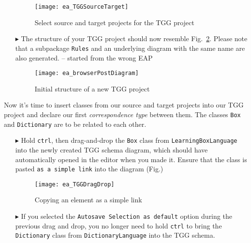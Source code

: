 \begin{itemize}
\begin{figure}[htbp]
\begin{center}
  \texttt{[image: ea\_TGGSourceTarget]}
  \caption{Select source and target projects for the TGG project}  
  \label{fig:select_source_target}
\end{center}
\end{figure}

\item[$\blacktriangleright$] The structure of your TGG project should now resemble Fig.~\ref{fig:new_tgg_project}. Please note that a subpackage \texttt{Rules}
and an underlying diagram with the same name are also generated. \update -- started from the wrong EAP

\begin{figure}[htbp]
\begin{center}
  \texttt{[image: ea\_browserPostDiagram]}
  \caption{Initial structure of a new TGG project}  
  \label{fig:new_tgg_project}
\end{center}
\end{figure}
\end{itemize}
\clearpage

Now it's time to insert classes from our source and target projects into our TGG project and declare our first \emph{correspondence type} between them.
The classes \texttt{Box} and \texttt{Dictionary} are to be related to each other.

\begin{itemize}
\item[$\blacktriangleright$] Hold \texttt{ctrl}, then drag-and-drop the \texttt{Box} class from \texttt{Learning\-Box\-Language} into the newly created TGG
schema diagram, which should have automatically opened in the editor when you made it. Ensure that the class is pasted \texttt{as a simple link} into the
diagram (Fig.)

\begin{figure}[htbp]
\begin{center}
  \texttt{[image: ea\_TGGDragDrop]}
  \caption{Copying an element as a simple link} 
  \label{fig:TGGdragDrop}
\end{center}
\end{figure}

\item[$\blacktriangleright$] If you selected the \texttt{Autosave Selection as default} option during the previous drag and drop, you no longer need to hold
\texttt{ctrl} to bring the \texttt{Dictionary} class from \texttt{Dictionary\-Language} into the TGG schema.
\end{itemize}

